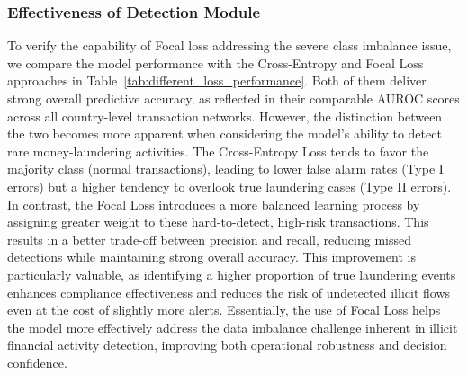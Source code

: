 \documentclass[11pt,english]{article}
\begin{document}
\subsubsection{Effectiveness of Detection Module} 
To verify the capability of Focal loss addressing the severe class imbalance issue, we compare the model performance with the Cross-Entropy and Focal Loss approaches in Table~\ref{tab:different_loss_performance}. Both of them deliver strong overall predictive accuracy, as reflected in their comparable AUROC scores across all country-level transaction networks. However, the distinction between the two becomes more apparent when considering the model’s ability to detect rare money-laundering activities. The Cross-Entropy Loss tends to favor the majority class (normal transactions), leading to lower false alarm rates (Type I errors) but a higher tendency to overlook true laundering cases (Type II errors). In contrast, the Focal Loss introduces a more balanced learning process by assigning greater weight to these hard-to-detect, high-risk transactions. This results in a better trade-off between precision and recall, reducing missed detections while maintaining strong overall accuracy. This improvement is particularly valuable, as identifying a higher proportion of true laundering events enhances compliance effectiveness and reduces the risk of undetected illicit flows even at the cost of slightly more alerts. Essentially, the use of Focal Loss helps the model more effectively address the data imbalance challenge inherent in illicit financial activity detection, improving both operational robustness and decision confidence.
\end{document}
